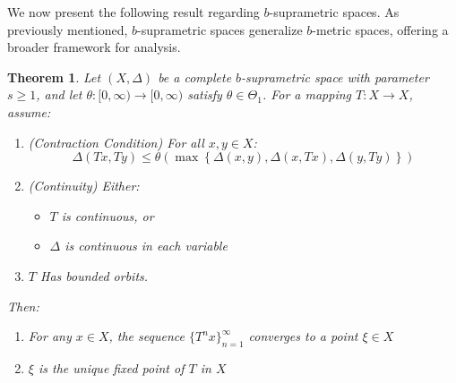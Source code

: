 \documentclass[pdflatex,sn-mathphys-num]{sn-jnl}%
\theoremstyle{thmstyleone}%
\newtheorem{theorem}{Theorem}%
\theoremstyle{thmstyletwo}%
\theoremstyle{thmstylethree}%
\begin{document}
We now present the following result regarding \( b\)-suprametric spaces. As previously mentioned, \( b\)-suprametric spaces generalize \( b \)-metric spaces, offering a broader framework for analysis.
\begin{theorem}\label{bsupra-gen-matko}
Let $(X, \Delta)$ be a complete $b$-suprametric space with parameter $s \geq 1$, and let $\theta \colon [0,\infty) \to [0,\infty)$ satisfy $\theta \in \Theta_1$. For a mapping $T \colon X \to X$, assume:

\begin{enumerate}[label=(\roman*)]
    \item (Contraction Condition) For all $x, y \in X$:
    \begin{equation}\label{fee-matk1}
    \Delta(Tx, Ty) \leq \theta\left(\max\left\{\Delta(x, y), \Delta(x, Tx), \Delta(y, Ty)\right\}\right)
    \end{equation}
    
    \item (Continuity) Either:
    \begin{itemize}
        \item $T$ is continuous, or
        \item $\Delta$ is continuous in each variable
    \end{itemize}
    
    \item  $T$ Has bounded orbits.
\end{enumerate}

Then:
\begin{enumerate}[label=(\alph*)]
    \item For any $x \in X$, the sequence $\{T^n x\}_{n=1}^\infty$ converges to a point $\xi \in X$
    \item $\xi$ is the unique fixed point of $T$ in $X$
\end{enumerate}
\end{theorem}
\end{document}

